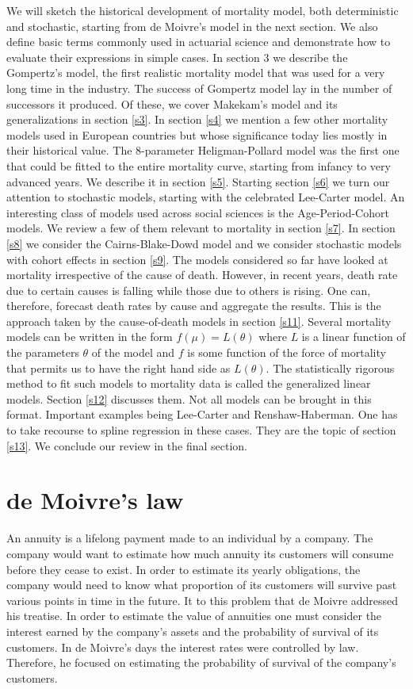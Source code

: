 \documentclass{article}
\numberwithin{equation}{section}
\begin{document}
We will sketch the historical development of mortality model, both 
deterministic and stochastic, starting from de Moivre's model in the next
section. We also define basic terms commonly used in actuarial science and 
demonstrate how to evaluate their expressions in simple cases. In section 3
we describe the Gompertz's model, the first realistic mortality model that 
was used for a very long time in the industry. The success of Gompertz model
lay in the number of successors it produced. Of these, we cover Makekam's 
model and its generalizations in section \ref{s3}. In section \ref{s4} we 
mention a few
other mortality models used in European countries but whose significance today
lies mostly in their historical value. The $8$-parameter Heligman-Pollard model
was the first one that could be fitted to the entire mortality curve, starting
from infancy to very advanced years. We describe it in section \ref{s5}. 
Starting section \ref{s6} we turn our attention to stochastic models, starting 
with the celebrated Lee-Carter model. An interesting class of models used 
across social sciences is the Age-Period-Cohort models. We review a few of them 
relevant to mortality in section \ref{s7}. In section \ref{s8} we consider the 
Cairns-Blake-Dowd model and we consider stochastic models with cohort effects in
 section \ref{s9}. 
The models considered so far have looked at mortality irrespective of the
cause of death. However, in recent years, death rate due to certain causes
is falling while those due to others is rising. One can, therefore, forecast
death rates by cause and aggregate the results. This is the approach taken by
the cause-of-death models in section \ref{s11}. Several mortality models can
be written in the form $f(\mu) = L(\theta)$ where $L$ is a linear function of
the parameters $\theta$ of the model and $f$ is some function of the force
of mortality that permits us to have the right hand side as $L(\theta)$. The
statistically rigorous method to fit such models to mortality data is called
the generalized linear models. Section \ref{s12} discusses them. Not all
models can be brought in this format. Important examples being Lee-Carter and
Renshaw-Haberman. One has to take recourse to spline regression in these
cases. They are the topic of section \ref{s13}. We conclude our review in the
final section.

\section{de Moivre's law}\label{s1}
An annuity is a lifelong payment made to an individual by a company. The 
company would want to estimate how much annuity its customers will consume
before they cease to exist. In order to estimate its yearly obligations, the
company would need to know what proportion of its customers will survive
past various points in time in the future. It to this problem that de Moivre 
\cite{de1731annuities} addressed his treatise. In order to estimate the value
of annuities one must consider the interest earned by the company's assets and
the probability of survival of its customers. In de Moivre's days the interest
rates were controlled by law. Therefore, he focused on estimating the 
probability of survival of the company's customers.
\end{document}
